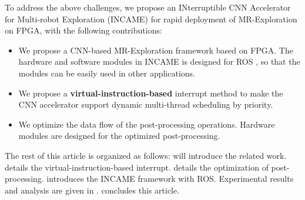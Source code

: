 To address the above challenges, we propose an INterruptible CNN Accelerator for Multi-robot Exploration (INCAME) for rapid deployment of MR-Exploration on FPGA, with the following contributions:

\begin{itemize}
\item We propose a CNN-based MR-Exploration framework based on FPGA. The hardware and software modules in INCAME is designed for ROS \cite{quigley2009ros}, so that the modules can be easily used in other applications.
\item We propose a \textbf{virtual-instruction-based} interrupt method to make the CNN accelerator support dynamic multi-thread scheduling by priority.
\item We optimize the data flow of the post-processing operations. Hardware modules are designed for the optimized post-processing.
\end{itemize}

The rest of this article is organized as follows:  will introduce the related work.  details the {virtual-instruction-based} interrupt.  details the optimization of post-processing.  introduces the INCAME framework with ROS. Experimental results and analysis are given in .  concludes this article.
